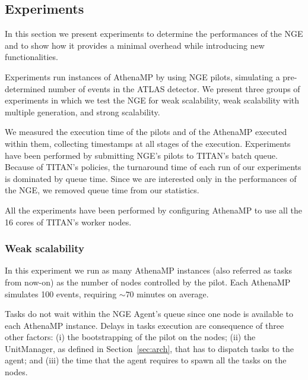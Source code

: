 
\subsection{Experiments}

In this section we present experiments %
to determine the performances of the NGE and to show how it provides a minimal
overhead while introducing new functionalities.

Experiments %
run instances of AthenaMP by using NGE pilots, %
simulating a pre-determined number of events in the ATLAS detector.
We present three groups of experiments in which we test the NGE for weak
scalability, weak scalability with multiple generation, and strong scalability.

We %
measured the execution time of the pilots and of the AthenaMP %
executed within them, collecting timestamps at %
all stages of the execution. Experiments have been performed %
by %
submitting NGE's pilots %
to TITAN's batch queue. Because of TITAN's %
policies, the turnaround time of each run of our experiments is dominated by
queue time. Since we are interested only in the performances of the NGE, we
removed queue time from our statistics.

All the experiments have been performed by %
configuring AthenaMP
to use all the 16 cores %
of TITAN's worker nodes.


\subsubsection{Weak scalability}

In this experiment %
we run as many AthenaMP instances (also referred as tasks from now-on) as the number of nodes controlled by the pilot. Each AthenaMP
simulates 100 events, requiring $\sim 70$ minutes on average.

Tasks do not %
wait within the NGE Agent's queue %
since %
one node %
is available to each AthenaMP instance. %
Delays in tasks execution are consequence of %
three other factors: (i) the bootstrapping of the pilot on the nodes; (ii) the
UnitManager, as defined in Section~\ref{sec:arch}, that has to dispatch tasks to
the agent; and (iii) the time that the agent requires to spawn all the tasks on
the nodes.


